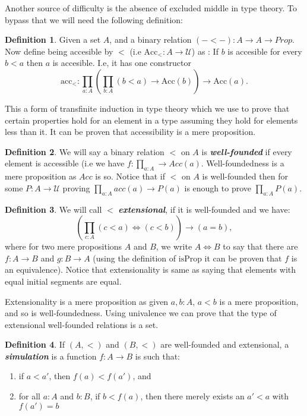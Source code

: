 \documentclass[10pt]{article}
\theoremstyle{definition}
\newtheorem{definition}{Definition}[section]
\theoremstyle{plain}
\theoremstyle{remark}
\newcommand{\U}{\mathscr{U}}
\begin{document}
Another source of difficulty is the absence of excluded middle in type theory. To bypass that
we will need the following definition:

\begin{definition}\label{D:Acc}
Given a set $A$, and a binary relation $(-<-) : A \to A \to Prop$. Now define being 
accesible by $<$ (i.e $\text{Acc}_{<} : A \to \U$) as : If $b$ is accesible for every $b<a$ 
then $a$ is accesible. I.e, it has one constructor 
\[ \text{acc}_< : \prod_{a : A} \left( \prod_{b : A} (b<a) \to \text{Acc}(b) \right) 
\to \text{Acc}(a). \]

\end{definition}
 
This a form of transfinite induction in type theory which we use to prove that certain
properties hold for an element in a type assuming they hold for elements less than it.
It can be proven that accessibility is a mere proposition. 

\begin{definition}\label{D:WF}
We will say a binary relation $<$ on $A$ is \textbf{\textit{well-founded}} if every element
is accessible (i.e we have $f : \prod_{a : A} \to Acc(a)$. Well-foundedness is a mere 
proposition as $Acc$ is so. Notice that if $<$ on $A$ is well-founded then for some 
$P : A \to \U$ proving $\prod_{a:A} acc(a) \to P(a)$ is enough to prove $\prod_{a : A} P(a)$.
\end{definition}

\begin{definition}\label{D:Ext}
We will call $<$ \textbf{\textit{extensional}}, if it is well-founded and we have:
\[ \left( \prod_{c : A}  (c<a) \iff (c<b) \right) \to (a = b),\]
where for two mere propositions $A$ and $B$, we write $A\iff B$ to say that there are 
$f : A \to B$ and $g : B \to A$ (using the definition of $\text{isProp}$ it can be proven 
that $f$ is an equivalence). Notice that extensionality is same as saying that elements 
with equal initial segments are equal.
\end{definition} 

Extensionality is a mere proposition as given $a,b:A$, $a<b$ is a mere proposition, and so
is well-foundedness. Using univalence we can prove that the type of extensional well-founded
relations is a set.

\begin{definition}\label{D:sim}
If $(A,<)$ and $(B,<)$ are well-founded and extensional, a \textbf{\textit{simulation}} is
a function $f : A \to B$ is such that:
\begin{enumerate}
\item if $a < a'$, then $f(a) < f(a')$, and
\item for all $a : A$ and $b : B$, if $b < f(a)$, then there merely exists an $a' < a$ with
      $f(a') = b$
\end{enumerate}
\end{definition} 
\end{document}
